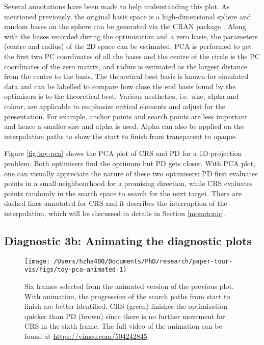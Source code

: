 Several annotations have been made to help understanding this plot. As
mentioned previously, the original basis space is a high-dimensional
sphere and random bases on the sphere can be generated via the CRAN
package  \citep{geozoo}. Along with the bases recorded
during the optimisation and a zero basis, the parameters (centre and
radius) of the 2D space can be estimated. PCA is performed to get the
first two PC coordinates of all the bases and the centre of the circle
is the PC coordinates of the zero matrix, and radius is estimated as the
largest distance from the centre to the basis. The theoretical best
basis is known for simulated data and can be labelled to compare how
close the end basis found by the optimisers is to the theoretical best.
Various aesthetics, i.e.~size, alpha and colour, are applicable to
emphasize critical elements and adjust for the presentation. For
example, anchor points and search points are less important and hence a
smaller size and alpha is used. Alpha can also be applied on the
interpolation paths to show the start to finish from transparent to
opaque.

Figure \ref{fig:toy-pca} shows the PCA plot of CRS and PD for a 1D
projection problem. Both optimisers find the optimum but PD gets closer.
With PCA plot, one can visually appreciate the nature of these two
optimisers: PD first evaluates points in a small neighbourhood for a
promising direction, while CRS evaluates points randomly in the search
space to search for the next target. There are dashed lines annotated
for CRS and it describes the interruption of the interpolation, which
will be discussed in details in Section \ref{monotonic}.

\hypertarget{diagnostic-3b-animating-the-diagnostic-plots}{%
\subsection{Diagnostic 3b: Animating the diagnostic
plots}\label{diagnostic-3b-animating-the-diagnostic-plots}}

\begin{Schunk}
\begin{figure}

{\centering \texttt{[image: /Users/hzha400/Documents/PhD/research/paper-tour-vis/figs/toy-pca-animated-1]} 

}

\caption{Six frames selected from the animated version of the previous plot. With animation, the progression of the search paths from start to finish are better identified. CRS (green) finishes the optimisation quicker than PD (brown) since there is no further movement for CRS in the sixth frame. The full video of the animation can be found at \url{https://vimeo.com/504242845}.}\label{fig:toy-pca-animated}
\end{figure}
\end{Schunk}


